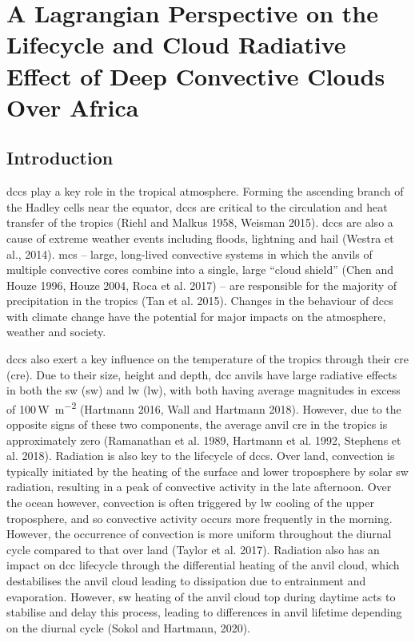 \chapter{A Lagrangian Perspective on the Lifecycle and Cloud Radiative Effect of Deep Convective Clouds Over Africa}


\section{Introduction}

\acrshort{dcc}s play a key role in the tropical atmosphere. 
Forming the ascending branch of the Hadley cells near the equator, \acrshort{dcc}s are critical to the circulation and heat transfer of the tropics (Riehl and Malkus 1958, Weisman 2015). 
\acrshort{dcc}s are also a cause of extreme weather events including floods, lightning and hail (Westra et al., 2014). 
\acrshort{mcs} -- large, long-lived convective systems in which the anvils of multiple convective cores combine into a single, large ``cloud shield'' (Chen and Houze 1996, Houze 2004, Roca et al. 2017) -- are responsible for the majority of precipitation in the tropics (Tan et al. 2015). 
Changes in the behaviour of \acrshort{dcc}s with climate change have the potential for major impacts on the atmosphere, weather and society.

\acrshort{dcc}s also exert a key influence on the temperature of the tropics
through their \acrshort{cre} (\acrshort{cre}). Due to their size, height
and depth, \acrshort{dcc} anvils have large radiative effects in both the \acrshort{sw}
(\acrshort{sw}) and \acrshort{lw} (\acrshort{lw}), with both having average magnitudes in excess of
100\,\unit{W m^{-2}} (Hartmann 2016, Wall and Hartmann 2018).
However, due to the opposite signs of these two components, the average
anvil \acrshort{cre} in the tropics is approximately zero (Ramanathan et al. 1989,
Hartmann et al. 1992, Stephens et al. 2018). Radiation is also key to
the lifecycle of \acrshort{dcc}s. Over land, convection is typically initiated by
the heating of the surface and lower troposphere by solar \acrshort{sw} radiation,
resulting in a peak of convective activity in the late afternoon. Over
the ocean however, convection is often triggered by \acrshort{lw} cooling of the
upper troposphere, and so convective activity occurs more frequently in
the morning. However, the occurrence of convection is more uniform
throughout the diurnal cycle compared to that over land (Taylor et al.
2017). Radiation also has an impact on \acrshort{dcc} lifecycle through the
differential heating of the anvil cloud, which destabilises the anvil
cloud leading to dissipation due to entrainment and evaporation.
However, \acrshort{sw} heating of the anvil cloud top during daytime acts to
stabilise and delay this process, leading to differences in anvil
lifetime depending on the diurnal cycle (Sokol and Hartmann, 2020).

